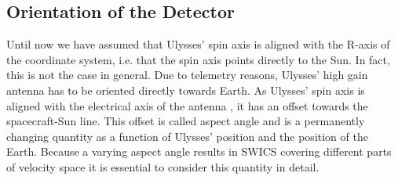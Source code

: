 \subsection{Orientation of the Detector}
Until now we have assumed that Ulysses' spin axis is aligned with the R-axis of the coordinate system, i.e. that the spin axis points directly to the Sun. In fact, this is not the case in general. Due to telemetry reasons, Ulysses' high gain antenna has to be oriented directly towards Earth. As Ulysses' spin axis is aligned with the electrical axis of the antenna \citep{wenzel_ulysses}, it has an offset towards the spacecraft-Sun line. This offset is called aspect angle and is a permanently changing quantity as a function of Ulysses' position and the position of the Earth. Because a varying aspect angle results in SWICS covering different parts of velocity space it is essential to consider this quantity in detail.
%
%
